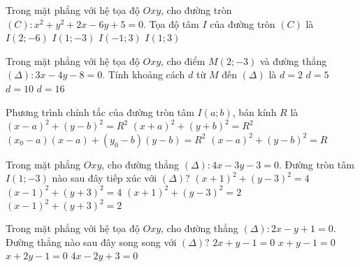 \begin{ex}%
Trong mặt phẳng với hệ tọa độ $Oxy$, cho đường tròn $(C)\colon x^2+y^2+2x-6y+5=0$. Tọa độ tâm $I$ của đường tròn $(C)$ là
\choice
{$I(2;-6)$}
{$I(1;-3)$}
{\True $I(-1;3)$}
{$I(1;3)$}
\end{ex}
\begin{ex}%
Trong mặt phẳng với hệ tọa độ $Oxy$, cho điểm $M(2;-3)$ và đường thẳng
$(\Delta)\colon 3x-4y-8=0$. Tính khoảng cách $d$ từ $M$ đến $(\Delta)$ là
\choice
{\True $d=2$}
{$d=5$}
{$d=10$}
{$d=16$}
\end{ex}
\begin{ex}%
Phương trình chính tắc của đường tròn tâm $I(a;b)$, bán kính $R$ là
\choice
{\True $(x-a)^2+(y-b)^2=R^2$}
{$(x+a)^2+(y+b)^2=R^2$}
{$\left(x_0-a\right)(x-a)+\left(y_0-b\right)(y-b)=R^2$}
{$(x-a)^2+(y-b)^2=R$}
\end{ex}
\begin{ex}%
Trong mặt phẳng $Oxy$, cho đường thẳng $(\Delta)\colon 4x-3y-3=0$. Đường tròn tâm $I(1;-3)$ nào sau đây tiếp xúc với $(\Delta)$?
\choice
{$(x+1)^2+(y-3)^2=4$}
{\True $(x-1)^2+(y+3)^2=4$}
{$(x+1)^2+(y-3)^2=2$}
{$(x-1)^2+(y+3)^2=2$}
\end{ex}
\begin{ex}%
Trong mặt phẳng với hệ tọa độ $Oxy$, cho đường thẳng $(\Delta)\colon 2x-y+1=0$. Đường thẳng nào sau đây song song với $(\Delta)$?
\choice
{$2x+y-1=0$}
{$x+y-1=0$}
{$x+2y-1=0$}
{\True $4x-2y+3=0$}
\end{ex}
